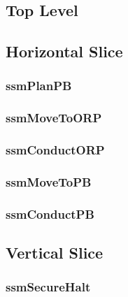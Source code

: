 \documentclass[../../main/main.tex]{subfiles}
\begin{document}
\subsection{Top Level}

\subsection{Horizontal Slice}

\subsubsection{ssmPlanPB}

\subsubsection{ssmMoveToORP}

\subsubsection{ssmConductORP}

\subsubsection{ssmMoveToPB}

\subsubsection{ssmConductPB}

\subsection{Vertical Slice}

\subsubsection{ssmSecureHalt}
\end{document}
